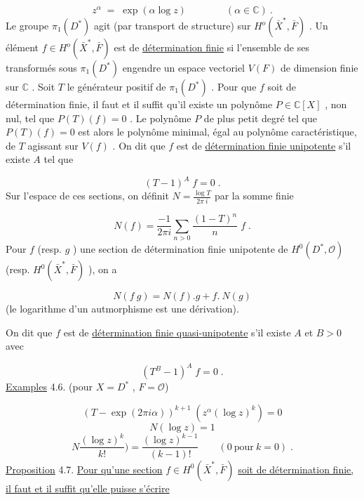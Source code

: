 \begin{equation*}
z^\alpha \;=\; \exp(\alpha \log z) \qquad\qquad (\alpha \in \mathbb{C}) \ .
\end{equation*}
Le groupe $\pi_1(D^*)$ agit (par transport de structure) sur $H^o(\bar{X}^*, \bar{F})$ . Un élément $f \in H^o(\bar{X}^*, \bar{F})$ est de \underline{détermination finie} si l'ensemble de ses transformés sous $\pi_1(D^*)$ engendre un espace vectoriel $V(F)$ de dimension finie sur $\mathbb{C}$ . Soit $T$ le générateur positif de $\pi_1(D^*)$ . Pour que $f$ soit de détermination finie,
il faut et il suffit qu'il existe un polynôme $P \in \mathbb{C}[X]$ , non nul, tel que $P(T)(f) = 0$ . Le polynôme $P$ de plus petit degré tel que $P(T)(f) = 0$ est alors le polynôme minimal, égal au polynôme caractéristique, de $T$ agissant sur $V(f)$ . On dit que $f$ est de \underline{détermination finie unipotente} s'il existe $A$ tel que

\begin{equation*}
(T-1)^A \; f = 0 \; .
\end{equation*}
Sur l'espace de ces sections, on définit $N = \frac{\log T}{2\pi\ i}$ par la somme finie

\begin{equation*}
N(f) = \frac{-1}{2\pi i} \sum_{n > 0} \frac{(1-T)^n}{n} \; f \; .
\end{equation*}
Pour $f$ (resp. $g$ ) une section de détermination finie unipotente de $H^0(D^*, \mathcal{O})$ (resp. $H^0(\bar{X}^*, \bar{F})$ ), on a

\begin{equation*}
N(f\ g) = N(f).g + f.\ N(g)
\end{equation*}
(le logarithme d'un autmorphisme est une dérivation).

On dit que $f$ est de \underline{détermination finie quasi-unipotente} s'il existe $A$ et $B > 0$ avec

\begin{equation*}
(T^B - 1)^A \; f = 0 \; .
\end{equation*}
\underline{Examples} 4.6. (pour $X = D^*$ , $F = \mathcal{O}$)

\begin{equation*}
(T - \exp(2\pi i\alpha))^{k+1} \; (z^{\alpha}(\log z)^k) = 0
\end{equation*}
\begin{equation*}
N(\log z) = 1
\end{equation*}
\begin{equation*}
N\frac{(\log z)^k}{k!}) = \frac{(\log z)^{k-1}}{(k-1)!} \qquad (0 \ \mbox{pour} \ k = 0) \; .
\end{equation*}
\underline{Proposition} 4.7. \underline{Pour qu'une section} $f \in H^0(\bar{X}^*, \bar{F})$ \underline{soit de détermination finie, il faut et il suffit qu'elle puisse s'écrire}

